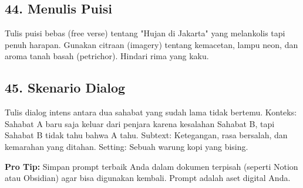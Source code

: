 \subsection{44. Menulis Puisi}
\begin{promptbox}
Tulis puisi bebas (free verse) tentang "Hujan di Jakarta" yang melankolis tapi penuh harapan.
Gunakan citraan (imagery) tentang kemacetan, lampu neon, dan aroma tanah basah (petrichor).
Hindari rima yang kaku.
\end{promptbox}

\subsection{45. Skenario Dialog}
\begin{promptbox}
Tulis dialog intens antara dua sahabat yang sudah lama tidak bertemu.
Konteks: Sahabat A baru saja keluar dari penjara karena kesalahan Sahabat B, tapi Sahabat B tidak tahu bahwa A tahu.
Subtext: Ketegangan, rasa bersalah, dan kemarahan yang ditahan.
Setting: Sebuah warung kopi yang bising.
\end{promptbox}

\begin{tipbox}
    \textbf{Pro Tip:} Simpan prompt terbaik Anda dalam dokumen terpisah (seperti Notion atau Obsidian) agar bisa digunakan kembali. Prompt adalah aset digital Anda.
\end{tipbox}
